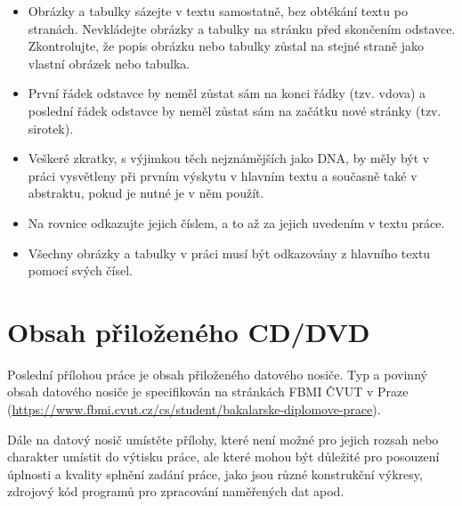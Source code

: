 \begin{itemize}
    \item Obrázky a tabulky sázejte v textu samostatně, bez obtékání textu po stranách. Nevkládejte obrázky a tabulky na stránku před skončením odstavce. Zkontrolujte, že popis obrázku nebo tabulky zůstal na stejné straně jako vlastní obrázek nebo tabulka.
    \item První řádek odstavce by neměl zůstat sám na konci řádky (tzv. vdova) a poslední řádek odstavce by neměl zůstat sám na začátku nové stránky (tzv. sirotek).
    \item Veškeré zkratky, s výjimkou těch nejznámějších jako DNA, by měly být v práci vysvětleny při prvním výskytu v hlavním textu a současně také v abstraktu, pokud je nutné je v něm použít.
    \item Na rovnice odkazujte jejich číslem, a to až za jejich uvedením v textu práce.
    \item Všechny obrázky a tabulky v práci musí být odkazovány z hlavního textu pomocí svých čísel. 
\end{itemize}

\clearpage

\chapter{Obsah přiloženého CD/DVD}
\label{app:obsah}
    
Poslední přílohou práce je obsah přiloženého datového nosiče. 
Typ a povinný obsah datového nosiče je specifikován na stránkách FBMI ČVUT v Praze (\url{https://www.fbmi.cvut.cz/cs/student/bakalarske-diplomove-prace}).

Dále na datový nosič umístěte přílohy, které není možné pro jejich rozsah nebo charakter umístit do výtisku práce, ale které mohou být důležité pro posouzení úplnosti a kvality splnění zadání práce, jako jsou různé konstrukční výkresy, zdrojový kód programů pro zpracování naměřených dat apod.